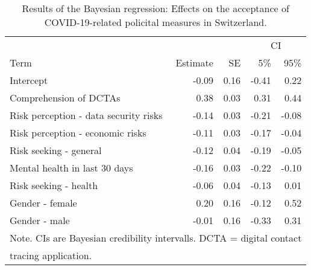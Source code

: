 \begin{table}[!h]

\caption{\label{tab:tab_results_policy_score}Results of the Bayesian regression: Effects on the acceptance of COVID-19-related policital measures in Switzerland.}
\centering
\begin{tabular}[t]{lrrrr}
\toprule
\multicolumn{1}{c}{} & \multicolumn{1}{c}{} & \multicolumn{1}{c}{} & \multicolumn{2}{c}{CI} \\
\cmidrule(l{3pt}r{3pt}){4-5}
Term & Estimate & SE & 5\% & 95\%\\
\midrule
Intercept & -0.09 & 0.16 & -0.41 & 0.22\\
Comprehension of DCTAs & 0.38 & 0.03 & 0.31 & 0.44\\
Risk perception - data security risks & -0.14 & 0.03 & -0.21 & -0.08\\
Risk perception - economic risks & -0.11 & 0.03 & -0.17 & -0.04\\
Risk seeking - general & -0.12 & 0.04 & -0.19 & -0.05\\
\addlinespace
Mental health in last 30 days & -0.16 & 0.03 & -0.22 & -0.10\\
Risk seeking - health & -0.06 & 0.04 & -0.13 & 0.01\\
Gender - female & 0.20 & 0.16 & -0.12 & 0.52\\
Gender - male & -0.01 & 0.16 & -0.33 & 0.31\\
\bottomrule
\multicolumn{5}{l}{\textsuperscript{} Note. CIs are Bayesian credibility intervalls. DCTA = digital contact}\\
\multicolumn{5}{l}{tracing application.}\\
\end{tabular}
\end{table}

